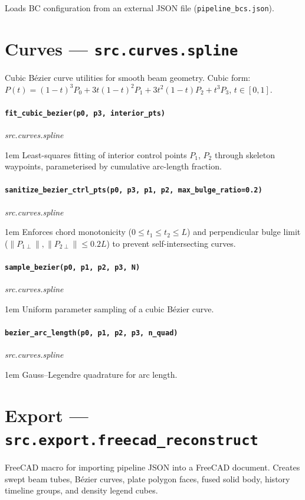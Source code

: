 \documentclass[a4paper, 11pt, openany]{report}
\newcommand{\apifunc}[2]{%
    \paragraph{\texttt{#2}}\hfill\textit{\small #1}\par\nopagebreak
}
\begin{document}
Loads BC configuration from an external JSON file (\texttt{pipeline\_bcs.json}).


\section{Curves --- \texttt{src.curves.spline}}
\label{sec:api-curves}

Cubic B\'ezier curve utilities for smooth beam geometry.  Cubic form:
$P(t) = (1-t)^3 P_0 + 3t(1-t)^2 P_1 + 3t^2(1-t) P_2 + t^3 P_3$, $t \in [0,1]$.

\apifunc{src.curves.spline}{fit\_cubic\_bezier(p0, p3, interior\_pts)}
\begin{adjustwidth}{1em}{}
Least-squares fitting of interior control points $P_1$, $P_2$ through
skeleton waypoints, parameterised by cumulative arc-length fraction.
\end{adjustwidth}

\apifunc{src.curves.spline}{sanitize\_bezier\_ctrl\_pts(p0, p3, p1, p2, max\_bulge\_ratio=0.2)}
\begin{adjustwidth}{1em}{}
Enforces chord monotonicity ($0 \le t_1 \le t_2 \le L$) and perpendicular
bulge limit ($\|P_{1\perp}\|, \|P_{2\perp}\| \le 0.2 L$) to prevent
self-intersecting curves.
\end{adjustwidth}

\apifunc{src.curves.spline}{sample\_bezier(p0, p1, p2, p3, N)}
\begin{adjustwidth}{1em}{}
Uniform parameter sampling of a cubic B\'ezier curve.
\end{adjustwidth}

\apifunc{src.curves.spline}{bezier\_arc\_length(p0, p1, p2, p3, n\_quad)}
\begin{adjustwidth}{1em}{}
Gauss--Legendre quadrature for arc length.
\end{adjustwidth}


\section{Export --- \texttt{src.export.freecad\_reconstruct}}
\label{sec:api-export}

FreeCAD macro for importing pipeline JSON into a FreeCAD document.  Creates
swept beam tubes, B\'ezier curves, plate polygon faces, fused solid body,
history timeline groups, and density legend cubes.
\end{document}

